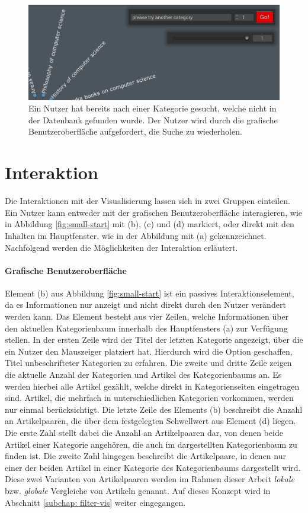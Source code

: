 \begin{figure}
    \centering
    \includegraphics[scale=.5]{images/small-start-wrong-cat-1.png}
    \caption{Ein Nutzer hat bereits nach einer Kategorie gesucht, welche nicht in der Datenbank gefunden wurde. Der Nutzer wird durch die grafische Benutzeroberfläche aufgefordert, die Suche zu wiederholen.}
    \label{fig:wrong-cat}
\end{figure}

\section{Interaktion} \label{subchap:interaktion}
Die Interaktionen mit der Visualisierung lassen sich in zwei Gruppen einteilen. Ein Nutzer kann entweder mit der grafischen Benutzeroberfläche interagieren, wie in Abbildung \ref{fig:small-start} mit (b), (c) und (d) markiert, oder direkt mit den Inhalten im Hauptfenster, wie in der Abbildung mit (a) gekennzeichnet.
Nachfolgend werden die Möglichkeiten der Interaktion erläutert.

\paragraph{Grafische Benutzeroberfläche}
Element (b) aus Abbildung \ref{fig:small-start} ist ein passives Interaktionselement, da es Informationen nur anzeigt und nicht direkt durch den Nutzer verändert werden kann.
Das Element besteht aus vier Zeilen, welche Informationen über den aktuellen Kategorienbaum innerhalb des Hauptfensters (a) zur Verfügung stellen.
In der ersten Zeile wird der Titel der letzten Kategorie angezeigt, über die ein Nutzer den Mauszeiger platziert hat.
Hierdurch wird die Option geschaffen, Titel unbeschrifteter Kategorien zu erfahren.
Die zweite und dritte Zeile zeigen die aktuelle Anzahl der Kategorien und Artikel des Kategorienbaums an.
Es werden hierbei alle Artikel gezählt, welche direkt in Kategorienseiten eingetragen sind. Artikel, die mehrfach in unterschiedlichen Kategorien vorkommen, werden nur einmal berücksichtigt.
Die letzte Zeile des Elements (b) beschreibt die Anzahl an Artikelpaaren, die über dem festgelegten Schwellwert aus Element (d) liegen.
Die erste Zahl stellt dabei die Anzahl an Artikelpaaren dar, von denen beide Artikel einer Kategorie angehören, die auch im dargestellten Kategorienbaum zu finden ist.
Die zweite Zahl hingegen beschreibt die Artikelpaare, in denen nur einer der beiden Artikel in einer Kategorie des Kategorienbaums dargestellt wird.
Diese zwei Varianten von Artikelpaaren werden im Rahmen dieser Arbeit \emph{lokale} bzw. \emph{globale} Vergleiche von Artikeln genannt.
Auf dieses Konzept wird in Abschnitt \ref{subchap: filter-vis} weiter eingegangen.

